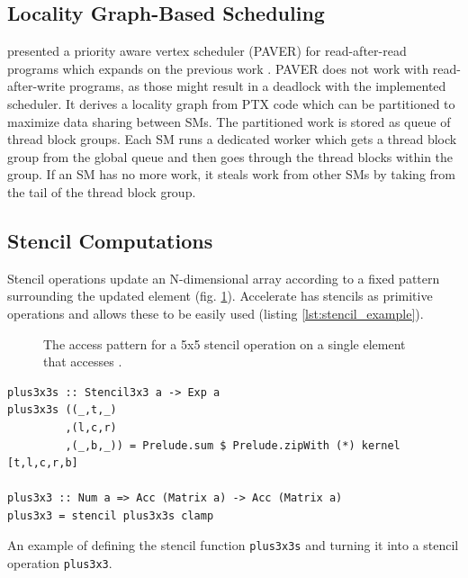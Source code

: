 \documentclass{article}
\begin{document}
\subsection{Locality Graph-Based Scheduling}
\citeauthor{tripathy2021paver} presented a priority aware vertex scheduler (PAVER) for read-after-read programs which expands on the previous work \cite{tripathy2021paver}.
PAVER does not work with read-after-write programs, as those might result in a deadlock with the implemented scheduler.
It derives a locality graph from PTX code which can be partitioned to maximize data sharing between SMs.
The partitioned work is stored as queue of thread block groups.
Each SM runs a dedicated worker which gets a thread block group from the global queue and then goes through the thread blocks within the group.
If an SM has no more work, it steals work from other SMs by taking from the tail of the thread block group.

\subsection{Stencil Computations}
Stencil operations update an N-dimensional array according to a fixed pattern surrounding the updated element (fig. \ref{fig:stencil_access_pattern}).
Accelerate has stencils as primitive operations and allows these to be easily used (listing \ref{lst:stencil_example}).

\begin{figure}[!hb]
    \centering
    \caption{
        The access pattern for a 5x5 stencil operation on a single element  that accesses .
    }
    \label{fig:stencil_access_pattern}
\end{figure}

\begin{listing}
    \begin{verbatim}
plus3x3s :: Stencil3x3 a -> Exp a
plus3x3s ((_,t,_)
         ,(l,c,r)
         ,(_,b,_)) = Prelude.sum $ Prelude.zipWith (*) kernel [t,l,c,r,b]

plus3x3 :: Num a => Acc (Matrix a) -> Acc (Matrix a)
plus3x3 = stencil plus3x3s clamp
    \end{verbatim}
    \caption{
        An example of defining the stencil function \texttt{plus3x3s} and turning it into a stencil operation \texttt{plus3x3}.
    }
    \label{lst:stencil_example}
\end{listing}
\end{document}
